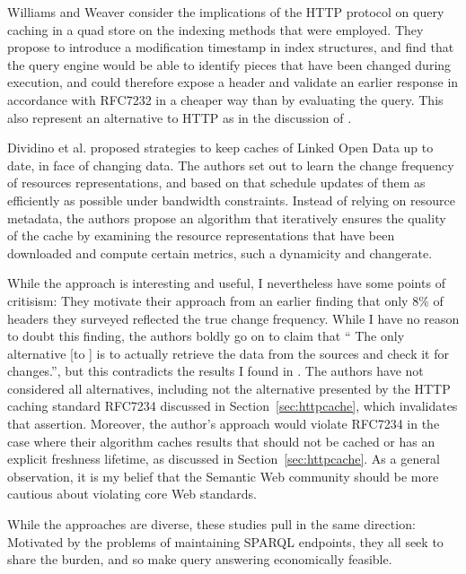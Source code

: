 Williams and Weaver \cite{kaseicache} consider the implications of the
HTTP protocol on query caching in a quad store on the indexing methods
that were employed. They propose to introduce a modification timestamp
in index structures, and find that the query engine would be able to
identify pieces that have been changed during execution, and could
therefore expose a  header and validate an
earlier response in accordance with RFC7232 \cite{rfc7232} in a cheaper way
than by evaluating the query. This also represent an alternative to HTTP
 as in the discussion of \cite{papailiou2015graph}.

Dividino et al. \cite{Dividino2015} proposed strategies to keep caches
of Linked Open Data up to date, in face of changing data. The authors
set out to learn the change frequency of resources representations,
and based on that schedule updates of them as efficiently as possible
under bandwidth constraints. Instead of relying on resource metadata,
the authors propose an algorithm that iteratively ensures the quality
of the cache by examining the resource representations that have been
downloaded and compute certain metrics, such a dynamicity and
changerate.


While the approach is interesting and useful, I nevertheless have some
points of critisism: They motivate their approach from an earlier
finding that only 8\% of  headers they surveyed
reflected the true change frequency. While I have no reason to doubt
this finding, the authors boldly go on to claim that `` The only
alternative [to ] is to actually retrieve the
data from the sources and check it for changes.'', but this
contradicts the results I found in \cite{kjernsmo_survey_2015}. The
authors have not considered all alternatives, including not the
alternative presented by the HTTP caching standard RFC7234 discussed
in Section~\ref{sec:httpcache}, which invalidates that
assertion. Moreover, the author's approach would violate RFC7234 in
the case where their algorithm caches results that should not be
cached or has an explicit freshness lifetime, as discussed in
Section~\ref{sec:httpcache}. As a general observation, it is my belief
that the Semantic Web community should be more cautious about
violating core Web standards.





While the approaches are diverse, these studies pull in the same
direction: Motivated by the problems of maintaining SPARQL endpoints,
they all seek to share the burden, and so make query answering
economically feasible.



